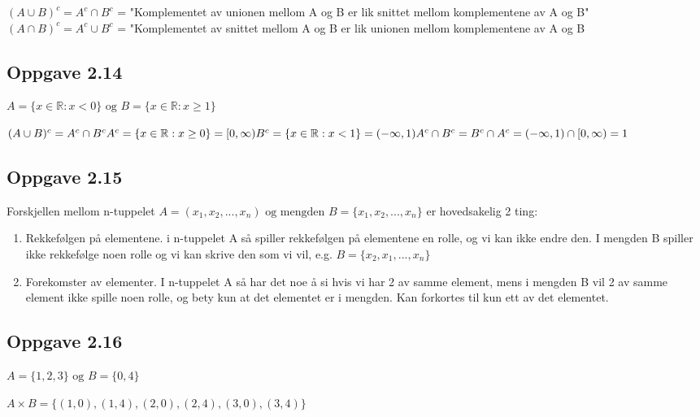 \documentclass{article}
\begin{document}
\((A \cup B)^c = A^c \cap B^c\) = "Komplementet av unionen mellom A og B er lik snittet mellom komplementene av A og B" \\

\((A \cap B)^c = A^c \cup B^c\) = "Komplementet av snittet mellom A og B er lik unionen mellom komplementene av A og B

\subsection*{Oppgave 2.14}

\(A = \{x \in \mathbb{R} : x < 0\} \text{  og  } B = \{x \in \mathbb{R} : x \ge 1\}\)

\((A \cup B)^c = A^c \cap B^c \\ \\
A^c = \{x \in \mathbb{R} : x \ge 0\} = [0, \infty)\\
B^c = \{x \in \mathbb{R} : x < 1\}  = (-\infty, 1) \\ \\
A^c \cap B^c = B^c \cap A^c = (-\infty, 1) \cap [0, \infty) = 1\)

\subsection*{Oppgave 2.15}

Forskjellen mellom n-tuppelet \(A = (x_1, x_2, ..., x_n) \text{ og mengden } B = \{x_1, x_2, ..., x_n\}\) er hovedsakelig 2 ting:
\begin{enumerate}
    \item Rekkefølgen på elementene. i n-tuppelet A så spiller rekkefølgen på elementene en rolle, og vi kan ikke endre den. I mengden B spiller ikke rekkefølge noen rolle og vi kan skrive den som vi vil, e.g. \(B = \{x_2, x_1, ...,  x_n\}\)
    \item Forekomster av elementer. I n-tuppelet A så har det noe å si hvis vi har 2 av samme element, mens i mengden B vil 2 av samme element ikke spille noen rolle, og bety kun at det elementet er i mengden. Kan forkortes til kun ett av det elementet.
\end{enumerate}

\subsection*{Oppgave 2.16}

\(A = \{1, 2, 3\} \text{ og } B = \{0, 4\}\)

\(A \times B = \{(1, 0), (1, 4), (2, 0), (2, 4), (3, 0), (3, 4)\}\)
\end{document}
